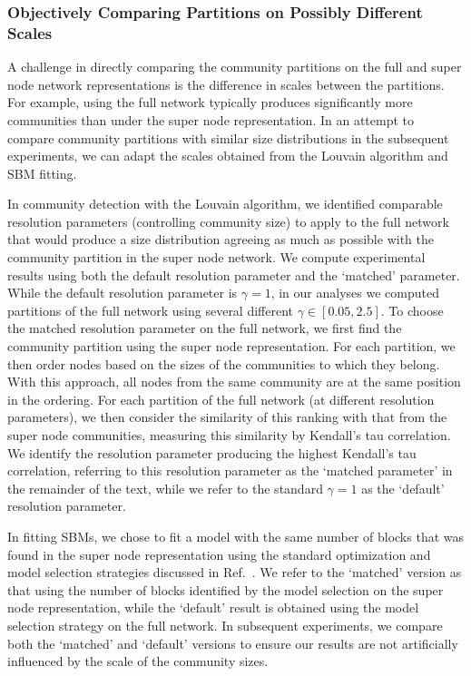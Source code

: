 \subsubsection{Objectively Comparing Partitions on Possibly Different Scales}
A challenge in directly comparing the community partitions on the full and super node network representations is the difference in scales between the partitions. For example, using the full network typically produces significantly more communities than under the super node representation. In an attempt to compare community partitions with similar size distributions in the subsequent experiments, we can adapt the scales obtained from the Louvain algorithm and SBM fitting.

In community detection with the Louvain algorithm, we identified comparable resolution parameters (controlling community size) to apply to the full network that would produce a size distribution agreeing as much as possible with the community partition in the super node network. We compute experimental results using both the default resolution parameter and the `matched' parameter. While the default resolution parameter is $\gamma=1$, in our analyses we computed partitions of the full network using several different $\gamma\in[0.05, 2.5]$. To choose the matched resolution parameter on the full network, we first find the community partition using the super node representation. For each partition, we then order nodes based on the sizes of the communities to which they belong. With this approach, all nodes from the same community are at the same position in the ordering. For each partition of the full network (at different resolution parameters), we then consider the similarity of this ranking with that from the super node communities, measuring this similarity by Kendall's tau correlation. We identify the resolution parameter producing the highest Kendall's tau correlation, referring to this resolution parameter as the `matched parameter' in the remainder of the text, while we refer to the standard $\gamma=1$ as the `default' resolution parameter.

In fitting SBMs, we chose to fit a model with the same number of blocks that was found in the super node representation using the standard optimization and model selection strategies discussed in Ref.~. We refer to the `matched' version as that using the number of blocks identified by the model selection on the super node representation, while the `default' result is obtained using the model selection strategy on the full network. In subsequent experiments, we compare both the `matched' and `default' versions to ensure our results are not artificially influenced by the scale of the community sizes.

